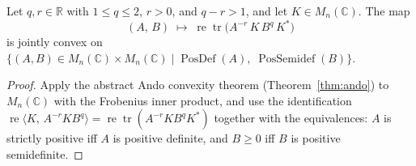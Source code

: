 \begin{corollary}
  \label{cor:ando_matrix}
  \leanok
  Let $q, r \in \mathbb{R}$ with $1 \leq q \leq 2$, $r > 0$, and $q - r > 1$,
  and let $K \in M_n(\mathbb{C})$.
  The map
  \[
    (A,\, B)
    \;\longmapsto\;
    \operatorname{re}\operatorname{tr}\!\bigl(A^{-r}\, K\, B^q\, K^*\bigr)
  \]
  is jointly convex on
  $\bigl\{(A, B) \in M_n(\mathbb{C}) \times M_n(\mathbb{C}) \mid
  \operatorname{PosDef}(A),\; \operatorname{PosSemidef}(B)\bigr\}$.
  \begin{proof}
    \leanok
    Apply the abstract Ando convexity theorem (Theorem~\ref{thm:ando})
    to $M_n(\mathbb{C})$ with the Frobenius inner product, and use
    the identification $\operatorname{re}\langle K,\, A^{-r} K B^q \rangle =
    \operatorname{re}\operatorname{tr}(A^{-r} K B^q K^*)$ together with the equivalences:
    $A$ is strictly positive iff $A$ is positive definite,
    and $B \geq 0$ iff $B$ is positive semidefinite.
  \end{proof}
\end{corollary}
